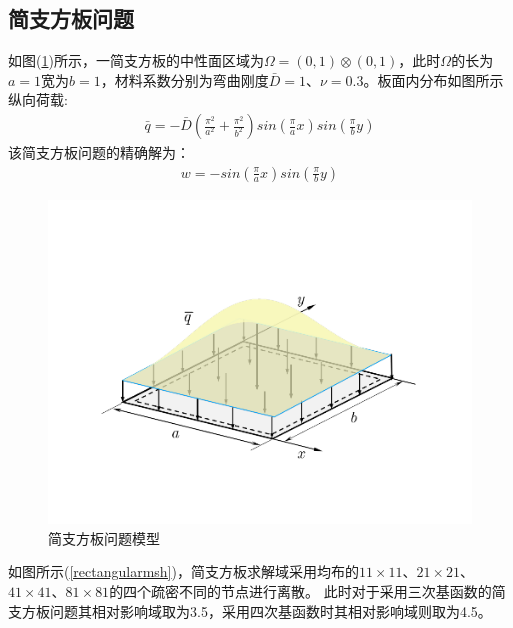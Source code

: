 \subsection{简支方板问题}
如图(\ref{rectangular})所示，一简支方板的中性面区域为$\Omega=(0,1)\otimes(0,1)$，此时$\Omega$的长为$a=1$宽为$b=1$，材料系数分别为弯曲刚度$\bar{D}=1$、$\nu=0.3$。板面内分布如图所示纵向荷载:
\begin{equation}
\begin{split}
    \bar q=-\bar D(\frac{\pi^2}{a^2}+\frac{\pi^2}{b^2})sin(\frac{\pi}{a}x)sin(\frac{\pi}{b}y)
\end{split}
\end{equation}
该简支方板问题的精确解为：
\begin{equation}
\begin{split}
    w=-sin(\frac{\pi}{a}x)sin(\frac{\pi}{b}y)
\end{split}
\end{equation}
\newpage
\begin{figure}[H]
\centering
    \includegraphics[scale=0.7]{figure/PHR/R/rectangular.png}
    \caption{简支方板问题模型}\label{rectangular}
\end{figure}
如图所示(\ref{rectangularmsh})，简支方板求解域采用均布的$11\times 11$、$21\times 21$、$41\times 41$、$81\times 81$的四个疏密不同的节点进行离散。
此时对于采用三次基函数的简支方板问题其相对影响域取为3.5，采用四次基函数时其相对影响域则取为4.5。\par

